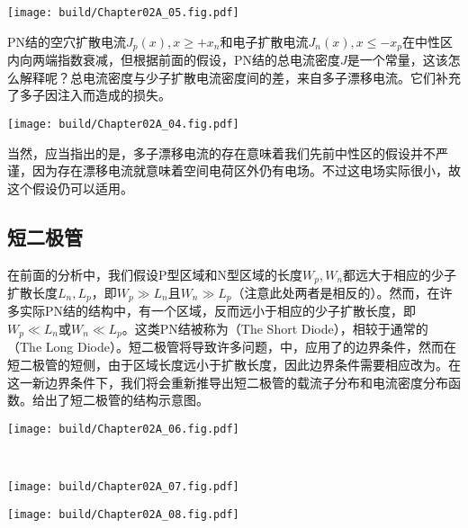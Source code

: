 \begin{Figure}
    \texttt{[image: build/Chapter02A\_05.fig.pdf]}
\end{Figure}

PN结的空穴扩散电流$J_p(x), x\geq +x_n$和电子扩散电流$J_n(x), x\leq -x_p$在中性区内向两端指数衰减，但根据前面的假设，PN结的总电流密度$J$是一个常量，这该怎么解释呢？总电流密度与少子扩散电流密度间的差，来自多子漂移电流。它们补充了多子因注入而造成的损失。

\begin{Figure}[PN结的电流密度分布]
    \texttt{[image: build/Chapter02A\_04.fig.pdf]}
\end{Figure}

当然，应当指出的是，多子漂移电流的存在意味着我们先前中性区的假设并不严谨，因为存在漂移电流就意味着空间电荷区外仍有电场。不过这电场实际很小，故这个假设仍可以适用。

\subsection{短二极管}
在前面的分析中，我们假设P型区域和N型区域的长度$W_p, W_n$都远大于相应的少子扩散长度$L_n, L_p$，即$W_p\gg L_n$且$W_n\gg L_p$（注意此处两者是相反的）。然而，在许多实际PN结的结构中，有一个区域，反而远小于相应的少子扩散长度，即$W_p\ll L_n$或$W_n\ll L_p$。这类PN结被称为（The Short Diode），相较于通常的（The Long Diode）。短二极管将导致许多问题，中，应用了的边界条件，然而在短二极管的短侧，由于区域长度远小于扩散长度，因此边界条件需要相应改为。在这一新边界条件下，我们将会重新推导出短二极管的载流子分布和电流密度分布函数。给出了短二极管的结构示意图。

\begin{Figure}[短二极管与长二极管]
    \begin{FigureSub}[长二极管]
        \texttt{[image: build/Chapter02A\_06.fig.pdf]}
    \end{FigureSub}\\ \vspace{0.5cm}
    \begin{FigureSub}[短二极管（N侧）]
        \texttt{[image: build/Chapter02A\_07.fig.pdf]}
    \end{FigureSub}\hspace{0.25cm}
    \begin{FigureSub}[短二极管（P侧）]
        \texttt{[image: build/Chapter02A\_08.fig.pdf]}
    \end{FigureSub}
\end{Figure}\vspace{0.15cm}


